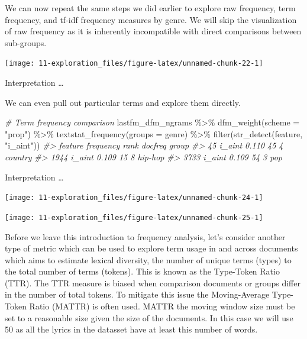 \documentclass[
]{article}
\newenvironment{Shaded}{\begin{snugshade}}{\end{snugshade}}
\newcommand{\AttributeTok}[1]{\textcolor[rgb]{0.77,0.63,0.00}{#1}}
\newcommand{\CommentTok}[1]{\textcolor[rgb]{0.56,0.35,0.01}{\textit{#1}}}
\newcommand{\FunctionTok}[1]{\textcolor[rgb]{0.00,0.00,0.00}{#1}}
\newcommand{\NormalTok}[1]{#1}
\newcommand{\SpecialCharTok}[1]{\textcolor[rgb]{0.00,0.00,0.00}{#1}}
\newcommand{\StringTok}[1]{\textcolor[rgb]{0.31,0.60,0.02}{#1}}
\begin{document}
We can now repeat the same steps we did earlier to explore raw frequency, term frequency, and tf-idf frequency measures by genre. We will skip the visualization of raw frequency as it is inherently incompatible with direct comparisons between sub-groups.

\begin{center}\texttt{[image: 11-exploration\_files/figure-latex/unnamed-chunk-22-1]} \end{center}

Interpretation \ldots{}

We can even pull out particular terms and explore them directly.

\begin{Shaded}
\begin{Highlighting}[]
\CommentTok{\# Term frequency comparison}
\NormalTok{lastfm\_dfm\_ngrams }\SpecialCharTok{\%\textgreater{}\%}
    \FunctionTok{dfm\_weight}\NormalTok{(}\AttributeTok{scheme =} \StringTok{"prop"}\NormalTok{) }\SpecialCharTok{\%\textgreater{}\%}
    \FunctionTok{textstat\_frequency}\NormalTok{(}\AttributeTok{groups =}\NormalTok{ genre) }\SpecialCharTok{\%\textgreater{}\%}
    \FunctionTok{filter}\NormalTok{(}\FunctionTok{str\_detect}\NormalTok{(feature, }\StringTok{"i\_ain\textquotesingle{}t"}\NormalTok{))}
\CommentTok{\#\textgreater{}      feature frequency rank docfreq   group}
\CommentTok{\#\textgreater{} 45   i\_ain\textquotesingle{}t     0.110   45       4 country}
\CommentTok{\#\textgreater{} 1944 i\_ain\textquotesingle{}t     0.109   15       8 hip{-}hop}
\CommentTok{\#\textgreater{} 3733 i\_ain\textquotesingle{}t     0.109   54       3     pop}
\end{Highlighting}
\end{Shaded}

Interpretation \ldots{}

\begin{center}\texttt{[image: 11-exploration\_files/figure-latex/unnamed-chunk-24-1]} \end{center}

\begin{center}\texttt{[image: 11-exploration\_files/figure-latex/unnamed-chunk-25-1]} \end{center}

Before we leave this introduction to frequency analysis, let's consider another type of metric which can be used to explore term usage in and across documents which aims to estimate lexical diversity, the number of unique terms (types) to the total number of terms (tokens). This is known as the Type-Token Ratio (TTR). The TTR measure is biased when comparison documents or groups differ in the number of total tokens. To mitigate this issue the Moving-Average Type-Token Ratio (MATTR) is often used. MATTR the moving window size must be set to a reasonable size given the size of the documents. In this case we will use 50 as all the lyrics in the datasset have at least this number of words.
\end{document}
